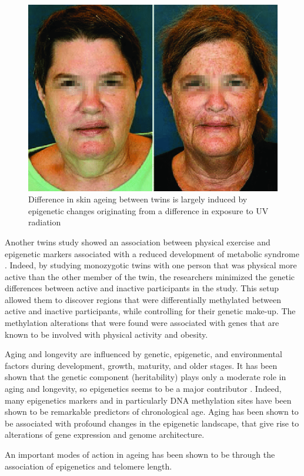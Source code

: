 \documentclass[
  11pt,
]{book}
\begin{document}
\begin{figure}

{\centering \includegraphics[width=0.5\linewidth]{./figs/dentical-twins-with-phenotypic-discordance-due-to-environmental-exposure-Although-MZ} 

}

\caption{Difference in skin ageing between twins is largely induced by epigenetic changes originating from a difference in exposure to UV radiation \citep{Schwab2017}}\label{fig:epiUV}
\end{figure}

Another twins study showed an association between physical exercise and epigenetic markers associated with a reduced development of metabolic syndrome \citep{Duncan2022}. Indeed, by studying monozygotic twins with one person that was physical more active than the other member of the twin, the researchers minimized the genetic differences between active and inactive participants in the study. This setup allowed them to discover regions that were differentially methylated between active and inactive participants, while controlling for their genetic make-up. The methylation alterations that were found were associated with genes that are known to be involved with physical activity and obesity.

Aging and longevity are influenced by genetic, epigenetic, and environmental factors during development, growth, maturity, and older stages.
It has been shown that the genetic component (heritability) plays only a moderate role in aging and longevity, so epigenetics seems to be a major contributor \citep{Adwan2018}. Indeed, many epigenetics markers and in particularly DNA methylation sites have been shown to be remarkable predictors of chronological age.
Aging has been shown to be associated
with profound changes in the epigenetic landscape, that give rise to alterations of gene expression and genome architecture.

An important modes of action in ageing has been shown to be through the association of epigenetics and telomere length.
\end{document}
